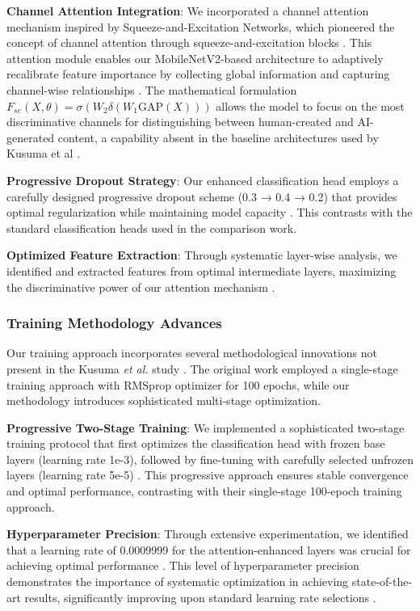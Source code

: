 \documentclass{article}
\begin{document}
\textbf{Channel Attention Integration}: We incorporated a channel attention mechanism inspired by Squeeze-and-Excitation Networks, which pioneered the concept of channel attention through squeeze-and-excitation blocks \cite{hu2018squeeze}. This attention module enables our MobileNetV2-based architecture to adaptively recalibrate feature importance by collecting global information and capturing channel-wise relationships \cite{hu2018squeeze}. The mathematical formulation $F_{se}(X, \theta) = \sigma (W_{2} \delta (W_{1}\text{GAP}(X)))$ allows the model to focus on the most discriminative channels for distinguishing between human-created and AI-generated content, a capability absent in the baseline architectures used by Kusuma et al \cite{hu2018squeeze}.

\textbf{Progressive Dropout Strategy}: Our enhanced classification head employs a carefully designed progressive dropout scheme (0.3 → 0.4 → 0.2) that provides optimal regularization while maintaining model capacity \cite{kusuma2024detection}. This contrasts with the standard classification heads used in the comparison work.

\textbf{Optimized Feature Extraction}: Through systematic layer-wise analysis, we identified and extracted features from optimal intermediate layers, maximizing the discriminative power of our attention mechanism \cite{howard2019searching}.

\subsubsection{Training Methodology Advances}

Our training approach incorporates several methodological innovations not present in the Kusuma \textit{et al.} study \cite{kusuma2024detection}\cite{kusuma2024detection}. The original work employed a single-stage training approach with RMSprop optimizer for 100 epochs, while our methodology introduces sophisticated multi-stage optimization.

\textbf{Progressive Two-Stage Training}: We implemented a sophisticated two-stage training protocol that first optimizes the classification head with frozen base layers (learning rate 1e-3), followed by fine-tuning with carefully selected unfrozen layers (learning rate 5e-5) \cite{kusuma2024detection}. This progressive approach ensures stable convergence and optimal performance, contrasting with their single-stage 100-epoch training approach.

\textbf{Hyperparameter Precision}: Through extensive experimentation, we identified that a learning rate of 0.0009999 for the attention-enhanced layers was crucial for achieving optimal performance \cite{kusuma2024detection}. This level of hyperparameter precision demonstrates the importance of systematic optimization in achieving state-of-the-art results, significantly improving upon standard learning rate selections \cite{howard2019searching}.
\end{document}
